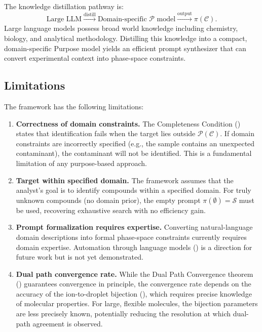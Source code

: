\documentclass[11pt,twocolumn,a4paper]{article}
\theoremstyle{definition}
\theoremstyle{remark}
\newcommand{\Sspace}{\mathcal{S}}
\newcommand{\Purpose}{\mathcal{P}}
\newcommand{\Context}{\mathcal{C}}
\newcommand{\Prompt}{\pi}
\begin{document}
The knowledge distillation pathway is:
\begin{equation}
  \text{Large LLM} \xrightarrow{\text{distill}} \text{Domain-specific } \Purpose \text{ model} \xrightarrow{\text{output}} \Prompt(\Context).
\end{equation}
Large language models \citep{brown2020} possess broad world knowledge including chemistry, biology, and analytical methodology. Distilling this knowledge into a compact, domain-specific Purpose model yields an efficient prompt synthesizer that can convert experimental context into phase-space constraints.

\subsection{Limitations}\label{sec:limitations}

The framework has the following limitations:

\begin{enumerate}[label=(\roman*)]
  \item \textbf{Correctness of domain constraints.} The Completeness Condition () states that identification fails when the target lies outside $\Purpose(\Context)$. If domain constraints are incorrectly specified (e.g., the sample contains an unexpected contaminant), the contaminant will not be identified. This is a fundamental limitation of any purpose-based approach.

  \item \textbf{Target within specified domain.} The framework assumes that the analyst's goal is to identify compounds within a specified domain. For truly unknown compounds (no domain prior), the empty prompt $\Prompt(\emptyset) = \Sspace$ must be used, recovering exhaustive search with no efficiency gain.

  \item \textbf{Prompt formalization requires expertise.} Converting natural-language domain descriptions into formal phase-space constraints currently requires domain expertise. Automation through language models () is a direction for future work but is not yet demonstrated.

  \item \textbf{Dual path convergence rate.} While the Dual Path Convergence theorem () guarantees convergence in principle, the convergence rate depends on the accuracy of the ion-to-droplet bijection (), which requires precise knowledge of molecular properties. For large, flexible molecules, the bijection parameters are less precisely known, potentially reducing the resolution at which dual-path agreement is observed.
\end{enumerate}
\end{document}
